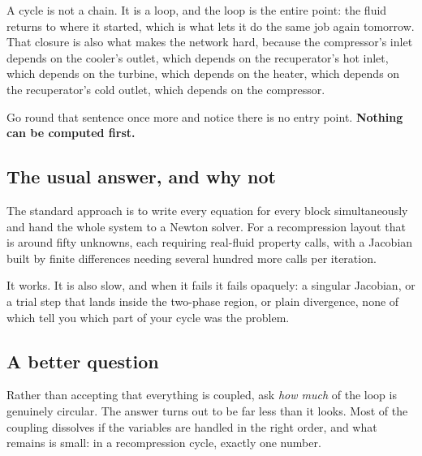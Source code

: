 \documentclass[11pt,a4paper]{report}
\begin{document}
A cycle is not a chain. It is a loop, and the loop is the entire point:
the fluid returns to where it started, which is what lets it do the same job
again tomorrow. That closure is also what makes the network hard, because
the compressor's inlet depends on the cooler's outlet, which depends on the
recuperator's hot inlet, which depends on the turbine, which depends on the
heater, which depends on the recuperator's cold outlet, which depends on the
compressor.

Go round that sentence once more and notice there is no entry point.
\textbf{Nothing can be computed first.}

\subsection{The usual answer, and why not}

The standard approach is to write every equation for every block
simultaneously and hand the whole system to a Newton solver. For a
recompression layout that is around fifty unknowns, each requiring
real-fluid property calls, with a Jacobian built by finite differences
needing several hundred more calls per iteration.

It works. It is also slow, and when it fails it fails opaquely: a singular
Jacobian, or a trial step that lands inside the two-phase region, or plain
divergence, none of which tell you which part of your cycle was the problem.

\subsection{A better question}

Rather than accepting that everything is coupled, ask \emph{how much} of the
loop is genuinely circular. The answer turns out to be far less than it
looks. Most of the coupling dissolves if the variables are handled in the
right order, and what remains is small: in a recompression cycle, exactly
one number.
\end{document}
